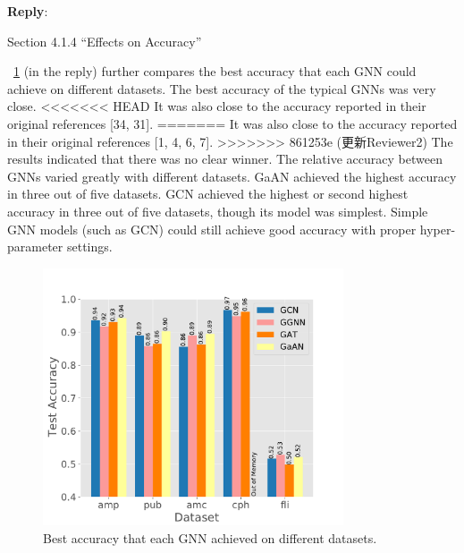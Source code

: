 \documentclass[12pt]{article}
\newenvironment{myquote}[1]%
{\vspace{0.5em}\begin{zitat}{#1}}
{\end{zitat}\vspace{0.5em}}
\newenvironment{reply}
   {\medskip \noindent \textbf{Reply}:\  }
   {\medskip}
\begin{document}
\begin{reply}
\begin{myquote}{Section 4.1.4 ``Effects on Accuracy''}
    
    \figurename~\ref{fig:exp_hyperparameter_on_accuracy_alg_contrast} (in the reply) further compares the best accuracy that each GNN could achieve on different datasets.
    The best accuracy of the typical GNNs was very close.
<<<<<<< HEAD
    It was also close to the accuracy reported in their original references [34, 31].
=======
    It was also close to the accuracy reported in their original references [1, 4, 6, 7].
>>>>>>> 861253e (更新Reviewer2)
    The results indicated that there was no clear winner.
    The relative accuracy between GNNs varied greatly with different datasets.
    GaAN achieved the highest accuracy in three out of five datasets.
    GCN achieved the highest or second highest accuracy in three out of five datasets, though its model was simplest.
    Simple GNN models (such as GCN) could still achieve good accuracy with proper hyper-parameter settings.
    
    \begin{figure}[H]
        \centering
        \includegraphics[width=3.5in]{../figs/experiments/exp_hyperparameter_on_accuracy_alg_contrast.pdf}
        \caption{Best accuracy that each GNN achieved on different datasets.}
        \label{fig:exp_hyperparameter_on_accuracy_alg_contrast}
    \end{figure}
    

    \end{myquote}
\end{reply}
\end{document}
